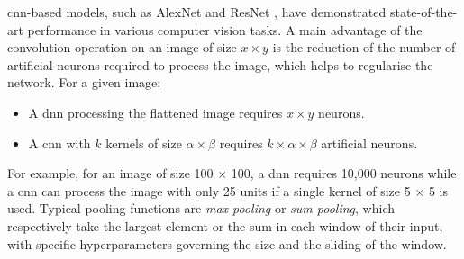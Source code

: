 \gls{cnn}-based models, such as AlexNet \cite{NIPS2012_c399862d} and ResNet \cite{resNetPaper}, have demonstrated state-of-the-art performance in various computer vision tasks. A main advantage of the convolution operation on an image of size $x \times y$ is the reduction of the number of artificial neurons required to process the image, which helps to regularise the network. For a given image:
\begin{itemize}
    \item A \gls{dnn} processing the flattened image requires $x \times y$ neurons. 
    \item A \gls{cnn} with $k$ kernels of size $\alpha \times \beta$ requires $k \times \alpha \times \beta$ artificial neurons. 
\end{itemize}
For example, for an image of size 100 $\times$ 100, a \gls{dnn} requires 10,000 neurons while a \gls{cnn} can process the image with only 25 units if a single kernel of size 5 $\times$ 5 is used. Typical pooling functions are \textit{max pooling} or \textit{sum pooling}, which respectively take the largest element or the sum in each window of their input, with specific hyperparameters governing the size and the sliding of the window.


